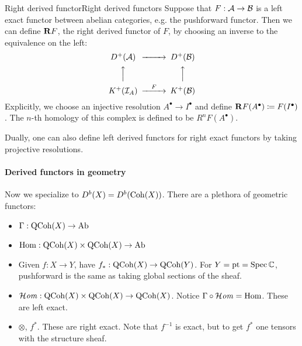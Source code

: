 
\begin{definition}{Right derived functor}{Right derived functors}
    Suppose that $F:\mathcal{A} \rightarrow \mathcal{B}$ is a left exact functor between abelian categories, e.g. the pushforward functor. Then we can define $\mathbf{R} F$, the right derived functor of $F$, by choosing an inverse to the equivalence on the left:
\begin{equation*}
    \begin{CD}
        D^+(\calA) @>>> D^+(\calB) \\
          @AAA @AAA \\
        K^+(\calI_A) @>F>> K^+(\calB)
    \end{CD}
\end{equation*}
Explicitly, we choose an injective resolution $A^\bullet\to I^\bullet$ and
define $\mathbf{R} F(A^\bullet)\coloneqq F(I^\bullet)$. The $n$-th homology of this complex is defined to be $R^nF(A^\bullet)$.
\end{definition}

Dually, one can also define left derived functors for right exact functors by taking projective resolutions.

\paragraph{Derived functors in geometry}

Now we specialize to $D^b(X)=D^b(\operatorname{Coh}(X))$. There are a plethora of geometric functors:

\begin{itemize}
    \item $\Gamma:\operatorname{QCoh}(X)\to\mathrm{Ab}$
    \item $\operatorname{Hom}:\operatorname{QCoh}(X)\times\operatorname{QCoh}(X)\to\mathrm{Ab}$
    \item Given $f:X\to Y$, have $f_*:\operatorname{QCoh}(X)\to\operatorname{QCoh}(Y)$. For $Y=\mathrm{pt}=\operatorname{Spec}\mathbb{C}$, pushforward is the same as taking global sections of the sheaf.
    \item $\operatorname{\mathcal{H}\mathit{om}}:\operatorname{QCoh}(X)\times\operatorname{QCoh}(X)\to\operatorname{QCoh}(X)$. Notice $\Gamma\circ\operatorname{\mathcal{H}\mathit{om}}=\operatorname{Hom}$. These are left exact.
    \item $\otimes$, $f^*$. These are right exact. Note that $f^{-1}$ is exact, but to get $f^*$ one tensors with the structure sheaf.
\end{itemize}

